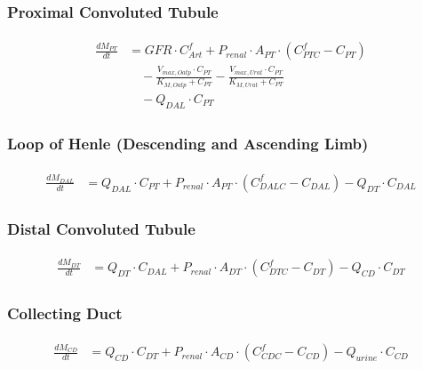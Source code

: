 \documentclass[preprint,12pt,authoryear]{elsarticle}
\begin{document}
\subsubsection{Proximal Convoluted Tubule}

\begin{align}
\begin{aligned}
\frac{dM_{PT}}{dt} &= GFR \cdot C_{Art}^f 
+ P_{renal} \cdot A_{PT}  \cdot (C_{PTC}^f - C_{PT}) \\
& \quad - \frac{V_{max,Oatp} \cdot C_{PT}}{K_{M,Oatp} + C_{PT}}
- \frac{V_{max,Urat} \cdot C_{PT}}{K_{M,Urat} + C_{PT}} \\
& \quad - Q_{DAL} \cdot C_{PT}
\end{aligned}
\label{eq:PFOA_proximal_convoluted_tubule}
\end{align}



\subsubsection{Loop of Henle (Descending and Ascending Limb)}

\begin{align}
\begin{aligned}
\frac{dM_{DAL}}{dt} &= Q_{DAL} \cdot C_{PT}
+ P_{renal} \cdot A_{PT}   \cdot (C_{DALC}^f - C_{DAL})
- Q_{DT} \cdot C_{DAL}
\end{aligned}
\label{eq:PFOA_loop_of_henle}
\end{align}

\subsubsection{Distal Convoluted Tubule}

\begin{align}
\begin{aligned}
\frac{dM_{DT}}{dt} &= Q_{DT} \cdot C_{DAL}
+ P_{renal} \cdot A_{DT}  \cdot (C_{DTC}^f - C_{DT})
- Q_{CD} \cdot C_{DT}
\end{aligned}
\label{eq:PFOA_distal_convoluted_tubule}
\end{align}

\subsubsection{Collecting Duct}

\begin{align}
\begin{aligned}
\frac{dM_{CD}}{dt} &= Q_{CD} \cdot C_{DT}
+ P_{renal} \cdot A_{CD}  \cdot (C_{CDC}^f - C_{CD})
- Q_{urine} \cdot C_{CD}
\end{aligned}
\label{eq:PFOA_collecting_duct}
\end{align}
\end{document}
